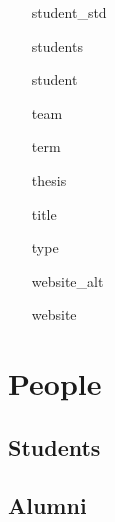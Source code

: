 \documentclass[11pt,letterpaper]{article}
\newcommand{\field}[1]{\textsf{#1}}
\begin{document}
\begin{itemize}
    \item[\field{student\_std}]
    \item[\field{students}]
    \item[\field{student}]
    \item[\field{team}]
    \item[\field{term}]
    \item[\field{thesis}]
    \item[\field{title}]
    \item[\field{type}]
    \item[\field{website\_alt}]
    \item[\field{website}]
\end{itemize}


\section{People}\label{sec:people}


\subsection{Students}\label{sec:people-current-phd}

\begin{refsection}
  \setlength{\bibitemsep}{\baselineskip}
  \nocite{*}
  \begin{multicols}{2}
    \raggedcolumns
    \printbibliography[heading=none,type=student,resetnumbers=true,omitnumbers=true,env=people]
  \end{multicols}
\end{refsection}


\clearpage
\subsection{Alumni}\label{sec:people-alumni}

\begin{refsection}
  \setlength{\bibitemsep}{\baselineskip}
  \nocite{*}
  \begin{multicols}{2}
    \raggedcolumns
    \printbibliography[heading=none,type=alumnus,resetnumbers=true,omitnumbers=true,env=people]
  \end{multicols}
\end{refsection}
\end{document}
